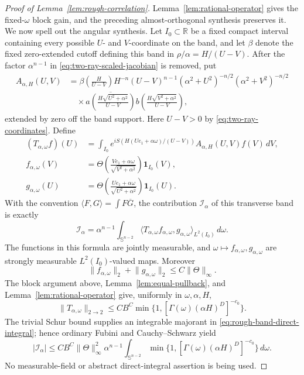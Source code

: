 \documentclass[11pt]{article}
\numberwithin{equation}{section}
\theoremstyle{remark}
\theoremstyle{definition}
\newcommand{\R}{\mathbb R}
\newcommand{\Sph}{\mathbb S}
\newcommand{\norm}[1]{\lVert #1\rVert}
\begin{document}
\begin{proof}[Proof of Lemma~\ref{lem:rough-correlation}]
Lemma~\ref{lem:rational-operator} gives the fixed-$\omega$ block gain,
and the preceding almost-orthogonal synthesis preserves it.  We now spell
out the angular synthesis.  Let $I_0\subset\R$ be a fixed compact interval
containing every possible $U$- and $V$-coordinate on the band, and let
$\beta$ denote the fixed zero-extended cutoff defining this band in
$\rho/\alpha=H/(U-V)$.  After the factor $\alpha^{n-1}$ in
\eqref{eq:two-ray-scaled-jacobian} is removed, put
\begin{align*}
 A_{\alpha,H}(U,V)
 &=\beta\left(\frac{H}{U-V}\right)
 H^{-n}(U-V)^{n-1}
 (\alpha^2+U^2)^{-n/2}(\alpha^2+V^2)^{-n/2}\\
 &\quad\times
 \overline{a\left(\frac{H\sqrt{U^2+\alpha^2}}{U-V}\right)}
 b\left(\frac{H\sqrt{V^2+\alpha^2}}{U-V}\right),
\end{align*}
extended by zero off the band support.  Here $U-V>0$ by
\eqref{eq:two-ray-coordinates}.  Define
\begin{align*}
 (T_{\alpha,\omega}f)(U)
 &=\int_{I_0}e^{iS(H(Ue_1+\alpha\omega)/(U-V))}
 A_{\alpha,H}(U,V)f(V)\,dV,\\
 f_{\alpha,\omega}(V)
 &=\Theta\left(\frac{Ve_1+\alpha\omega}
                    {\sqrt{V^2+\alpha^2}}\right)\mathbf1_{I_0}(V),\\
 g_{\alpha,\omega}(U)
 &=\Theta\left(\frac{Ue_1+\alpha\omega}
                    {\sqrt{U^2+\alpha^2}}\right)\mathbf1_{I_0}(U).
\end{align*}
With the convention $\langle F,G\rangle=\int F\overline G$, the
contribution $\mathcal I_\alpha$ of this transverse band is exactly
\begin{equation}\label{eq:rough-band-direct-integral}
 \mathcal I_\alpha
 =\alpha^{n-1}\int_{\Sph^{n-2}}
 \langle T_{\alpha,\omega}f_{\alpha,\omega},
         g_{\alpha,\omega}\rangle_{L^2(I_0)}\,d\omega.
\end{equation}
The functions in this formula are jointly measurable, and
$\omega\mapsto f_{\alpha,\omega},g_{\alpha,\omega}$ are strongly
measurable $L^2(I_0)$-valued maps.  Moreover
\[
 \norm{f_{\alpha,\omega}}_2+\norm{g_{\alpha,\omega}}_2
 \le C\norm\Theta_\infty.
\]
The block argument above, Lemma~\ref{lem:equal-pullback}, and
Lemma~\ref{lem:rational-operator} give, uniformly in $\omega,\alpha,H$,
\begin{equation}\label{eq:rough-fixed-angular-operator}
 \norm{T_{\alpha,\omega}}_{2\to2}
 \le CB^C\min\{1,[\Gamma(\omega)(\alpha H)^D]^{-c_0}\}.
\end{equation}
The trivial Schur bound supplies an integrable majorant in
\eqref{eq:rough-band-direct-integral}; hence ordinary Fubini and
Cauchy--Schwarz yield
\begin{equation}\label{eq:rough-band-angular-integral}
 |\mathcal I_\alpha|
 \le CB^C\norm\Theta_\infty^2\alpha^{n-1}
 \int_{\Sph^{n-2}}
 \min\{1,[\Gamma(\omega)(\alpha H)^D]^{-c_0}\}\,d\omega.
\end{equation}
No measurable-field or abstract direct-integral assertion is being used.


\end{proof}
\end{document}
